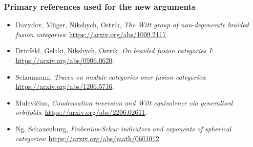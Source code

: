 \documentclass[
  11pt,
]{article}
\providecommand{\tightlist}{%
  \setlength{\itemsep}{0pt}\setlength{\parskip}{0pt}}
\begin{document}
\hypertarget{primary-references-used-for-the-new-arguments}{%
\subsubsection{Primary references used for the new
arguments}\label{primary-references-used-for-the-new-arguments}}

\begin{itemize}
\tightlist
\item
  Davydov, Müger, Nikshych, Ostrik, \emph{The Witt group of
  non-degenerate braided fusion categories}:
  \url{https://arxiv.org/abs/1009.2117}.
\item
  Drinfeld, Gelaki, Nikshych, Ostrik, \emph{On braided fusion categories
  I}: \url{https://arxiv.org/abs/0906.0620}.
\item
  Schaumann, \emph{Traces on module categories over fusion categories}:
  \url{https://arxiv.org/abs/1206.5716}.
\item
  Mulevičius, \emph{Condensation inversion and Witt equivalence via
  generalised orbifolds}: \url{https://arxiv.org/abs/2206.02611}.
\item
  Ng, Schauenburg, \emph{Frobenius-Schur indicators and exponents of
  spherical categories}: \url{https://arxiv.org/abs/math/0601012}.
\end{itemize}
\end{document}
